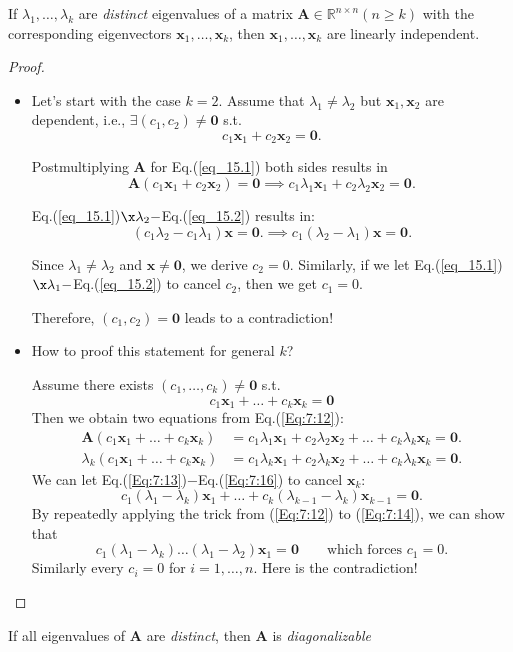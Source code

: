 \begin{theorem}
If $\lambda_1,\dots,\lambda_k$ are \textit{distinct} eigenvalues of a matrix $\bm A\in\mathbb{R}^{n\times n} (n\ge k)$ with the corresponding eigenvectors $\bm x_1,\dots,\bm x_k$, then $\bm x_1,\dots,\bm x_k$ are linearly independent.
\end{theorem}
\begin{proof}\begin{itemize}
\item
Let's start with the case $k=2$. Assume that $\lambda_1\ne\lambda_2$ but $\bm x_1,\bm x_2$ are dependent, i.e., $\exists(c_1,c_2)\ne\bm 0$ s.t.
\begin{equation}\label{eq_15.1}
c_1\bm x_1+c_2\bm x_2=\bm 0.
\end{equation}

Postmultiplying $\bm A$ for Eq.(\ref{eq_15.1}) both sides results in
\begin{equation}\label{eq_15.2}
\bm A(c_1\bm x_1+c_2\bm x_2)=\bm 0
\implies
c_1\lambda_1\bm x_1+c_2\lambda_2\bm x_2=\bm 0.
\end{equation}

Eq.(\ref{eq_15.1})$\x\lambda_2 - $Eq.(\ref{eq_15.2}) results in:
\[
(c_1\lambda_2-c_1\lambda_1)\bm x=\bm 0.
\implies
c_1(\lambda_2-\lambda_1)\bm x=\bm 0.
\]

Since $\lambda_1\ne\lambda_2$ and $\bm x\ne\bm 0$, we derive $c_2=0$. Similarly, if we let Eq.(\ref{eq_15.1})$\x\lambda_1-$Eq.(\ref{eq_15.2}) to cancel $c_2$, then we get $c_1=0$.

Therefore, $(c_1,c_2)=\bm 0$ leads to a contradiction!
\item
How to proof this statement for general $k$?

Assume there exists $(c_1,\dots,c_k)\ne\bm 0$ s.t.
\begin{equation}\label{Eq:7:12}
c_1\bm x_1+\dots+c_k\bm x_k=\bm 0
\end{equation}
Then we obtain two equations from Eq.(\ref{Eq:7:12}):
\begin{align}
\bm A(c_1\bm x_1+\dots+c_k\bm x_k)&=c_1\lambda_1\bm x_1+c_2\lambda_2\bm x_2+\dots+c_k\lambda_k\bm x_k=\bm 0.\label{Eq:7:13}\\
\lambda_k(c_1\bm x_1+\dots+c_k\bm x_k)&=c_1\lambda_k\bm x_1+c_2\lambda_k\bm x_2+\dots+c_k\lambda_k\bm x_k=\bm 0.\label{Eq:7:16}
\end{align}
We can let Eq.(\ref{Eq:7:13})$-$Eq.(\ref{Eq:7:16}) to cancel $\bm x_k$:
\begin{equation}\label{Eq:7:14}
c_1(\lambda_1-\lambda_k)\bm x_1+\dots+c_k(\lambda_{k-1}-\lambda_k)\bm x_{k-1}=\bm 0.
\end{equation}
By repeatedly applying the trick from (\ref{Eq:7:12}) to (\ref{Eq:7:14}), we can show that
\[
c_1(\lambda_1-\lambda_k)\dots(\lambda_1-\lambda_2)\bm x_1=\bm 0\qquad
\text{which forces }c_1=0.
\]
Similarly every $c_i=0$ for $i=1,\dots,n$. Here is the contradiction!
\end{itemize}
\end{proof}
\begin{corollary}
If all eigenvalues of $\bm A$ are \textit{distinct}, then $\bm A$ is \textit{diagonalizable}
\end{corollary}

